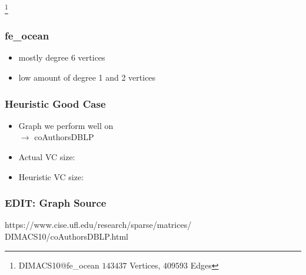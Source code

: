 \documentclass{beamer}[12pt]
\newcommand\blfootnote[1]{%
	\begingroup
	\renewcommand\thefootnote{}\footnote{#1}%
	\addtocounter{footnote}{-1}%
	\endgroup
}
\begin{document}
\begin{frame}
\blfootnote{DIMACS10@fe\_ocean $143437$ Vertices, $409593$ Edges}
\end{frame}
\usebackgroundtemplate{}

\begin{frame}
\frametitle{fe\_ocean}

\begin{center}
\end{center}

\begin{itemize}
\item mostly degree 6 vertices
\item low amount of degree 1 and 2 vertices
\end{itemize}	
\end{frame}

\begin{frame}
\frametitle{Heuristic Good Case}
\begin{itemize}
\item Graph we perform well on \\
$\rightarrow$ coAuthorsDBLP
\item Actual VC size:\quad{}
\item Heuristic VC size:
\end{itemize}
\end{frame}

\begin{frame}
\frametitle{EDIT: Graph Source}
https://www.cise.ufl.edu/research/sparse/matrices/\\
DIMACS10/coAuthorsDBLP.html
\end{frame}

\end{document}
